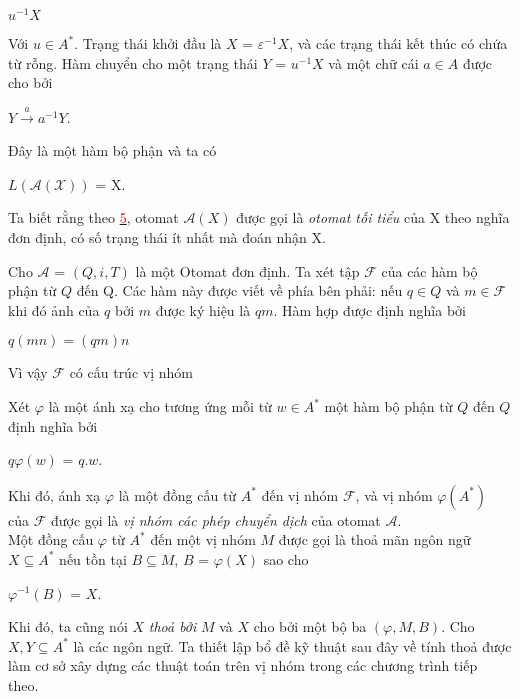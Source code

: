 $u^{-1}X$
\begin{flushleft}
Với $u \in A^*$. Trạng thái khởi đầu là $X$ = $\varepsilon^{-1} X$, và các trạng thái kết thúc có chứa từ rỗng. Hàm chuyển cho một trạng thái $Y$ = $u^{-1} X$ và một chữ cái $a \in A$ được cho bởi  
\end{flushleft}
$Y \xrightarrow{a} a^{-1} Y$.
\begin{flushleft}
Đây là một hàm bộ phận và ta có 
\end{flushleft}
$L(\mathcal{A(X)})$ = X.
\begin{flushleft}
\hspace{10mm}Ta biết rằng theo \hyperlink{page.78}{\textcolor{red}{5}}, otomat $\mathcal{A} (X)$ được gọi là \textit{otomat tối tiểu} của X theo nghĩa đơn định, có số trạng thái ít nhất mà đoán nhận X. 
\end{flushleft}
\begin{flushleft}
\hspace{10mm}Cho $\mathcal{A}$ = $(Q, i, T)$ là một Otomat đơn định. Ta xét tập $\mathcal{F}$ của các hàm bộ phận từ $Q$ đến Q. Các hàm này được viết về phía bên phải: nếu $q \in Q$ và $m \in \mathcal{F}$ khi đó ảnh của $q$ bởi $m$ được ký hiệu là $qm$. Hàm hợp được định nghĩa bởi 
\end{flushleft}
$q (mn) = (qm) n $
\begin{flushleft}
\hspace{10mm}Vì vậy $\mathcal{F}$ có cấu trúc vị nhóm 
\end{flushleft}
\begin{flushleft}
\hspace{10mm}Xét $\varphi$ là một ánh xạ cho tương ứng mỗi từ $w \in A^*$ một hàm bộ phận từ $Q$ đến $Q$ định nghĩa bởi 
\end{flushleft}
$q \varphi (w) $ = $q.w.$
\begin{flushleft}
    \hspace{10mm}Khi đó, ánh xạ $\varphi$ là một đồng cấu từ $A^*$ đến vị nhóm $\mathcal{F}$, và vị nhóm $\varphi (A^*) $ của $\mathcal{F}$ được gọi là \textit{vị nhóm các phép chuyển dịch} của otomat $\mathcal{A}$.\\
    \hspace{10mm}Một đồng cấu $\varphi$ từ $A^*$ đến một vị nhóm $M$ được gọi là thoả mãn ngôn ngữ $X \subseteq A^*$ nếu tồn tại $B \subseteq M$, $B$ = $\varphi(X)$ sao cho 
\end{flushleft}
$\varphi^{-1}(B)$ = $X$.
\begin{flushleft}
    \hspace{10mm}Khi đó, ta cũng nói $X$ \textit{thoả bởi} $M$ và $X$ cho bởi một bộ ba $(\varphi, M, B)$.
    \hspace{10mm}Cho $X, Y \subseteq A^*$ là các ngôn ngữ. Ta thiết lập bổ đề kỹ thuật sau đây về tính thoả được làm cơ sở xây dựng các thuật toán trên vị nhóm trong các chương trình tiếp theo.
\end{flushleft}
